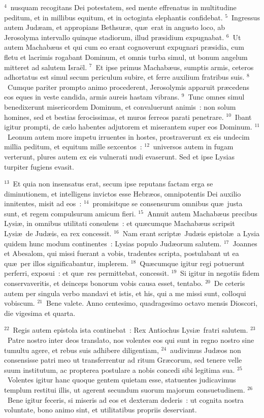 ${}^{4}$~nusquam recogitans Dei potestatem, sed mente effrenatus in multitudine peditum, et in millibus equitum, et in octoginta elephantis confidebat.
${}^{5}$~Ingressus autem Jud\ae am, et appropians Bethsur\ae , qu\ae\ erat in angusto loco, ab Jerosolyma intervallo quinque stadiorum, illud pr\ae sidium expugnabat.
${}^{6}$~Ut autem Machab\ae us et qui cum eo erant cognoverunt expugnari pr\ae sidia, cum fletu et lacrimis rogabant Dominum, et omnis turba simul, ut bonum angelum mitteret ad salutem Isra\"el.
${}^{7}$~Et ipse primus Machab\ae us, sumptis armis, ceteros adhortatus est simul secum periculum subire, et ferre auxilium fratribus suis.
${}^{8}$~Cumque pariter prompto animo procederent, Jerosolymis apparuit pr\ae cedens eos eques in veste candida, armis aureis hastam vibrans.
${}^{9}$~Tunc omnes simul benedixerunt misericordem Dominum, et convaluerunt animis~: non solum homines, sed et bestias ferocissimas, et muros ferreos parati penetrare.
${}^{10}$~Ibant igitur prompti, de c\ae lo habentes adjutorem et miserantem super eos Dominum.
${}^{11}$~Leonum autem more impetu irruentes in hostes, prostraverunt ex eis undecim millia peditum, et equitum mille sexcentos~:
${}^{12}$~universos autem in fugam verterunt, plures autem ex eis vulnerati nudi evaserunt. Sed et ipse Lysias turpiter fugiens evasit.


${}^{13}$~Et quia non insensatus erat, secum ipse reputans factam erga se diminutionem, et intelligens invictos esse Hebr\ae os, omnipotentis Dei auxilio innitentes, misit ad eos~:
${}^{14}$~promisitque se consensurum omnibus qu\ae\ justa sunt, et regem compulsurum amicum fieri.
${}^{15}$~Annuit autem Machab\ae us precibus Lysi\ae , in omnibus utilitati consulens~: et qu\ae cumque Machab\ae us scripsit Lysi\ae\ de Jud\ae is, ea rex concessit.
${}^{16}$~Nam erant script\ae\ Jud\ae is epistol\ae\ a Lysia quidem hunc modum continentes~: Lysias populo Jud\ae orum salutem.
${}^{17}$~Joannes et Abesalom, qui missi fuerant a vobis, tradentes scripta, postulabant ut ea qu\ae\ per illos significabantur, implerem.
${}^{18}$~Qu\ae cumque igitur regi potuerunt perferri, exposui~: et qu\ae\ res permittebat, concessit.
${}^{19}$~Si igitur in negotiis fidem conservaveritis, et deinceps bonorum vobis causa esset, tentabo.
${}^{20}$~De ceteris autem per singula verbo mandavi et istis, et his, qui a me missi sunt, colloqui vobiscum.
${}^{21}$~Bene valete. Anno centesimo, quadragesimo octavo mensis Dioscori, die vigesima et quarta.


${}^{22}$~Regis autem epistola ista continebat~: Rex Antiochus Lysi\ae\ fratri salutem.
${}^{23}$~Patre nostro inter deos translato, nos volentes eos qui sunt in regno nostro sine tumultu agere, et rebus suis adhibere diligentiam,
${}^{24}$~audivimus Jud\ae os non consensisse patri meo ut transferrentur ad ritum Gr\ae corum, sed tenere velle suum institutum, ac propterea postulare a nobis concedi sibi legitima sua.
${}^{25}$~Volentes igitur hanc quoque gentem quietam esse, statuentes judicavimus templum restitui illis, ut agerent secundum suorum majorum consuetudinem.
${}^{26}$~Bene igitur feceris, si miseris ad eos et dexteram dederis~: ut cognita nostra voluntate, bono animo sint, et utilitatibus propriis deserviant.


